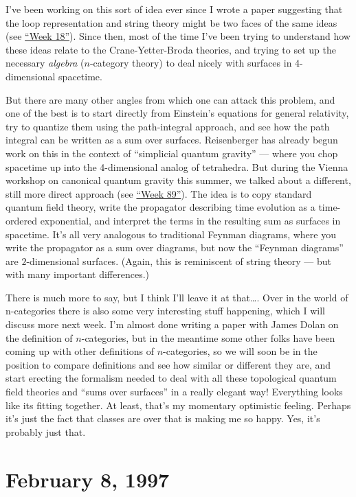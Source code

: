 \documentclass{article}
\begin{document}
I've been working on this sort of idea ever since I wrote a paper
suggesting that the loop representation and string theory might be two
faces of the same ideas (see \protect\hyperlink{week18}{``Week 18''}).
Since then, most of the time I've been trying to understand how these
ideas relate to the Crane-Yetter-Broda theories, and trying to set up
the necessary \emph{algebra} (\(n\)-category theory) to deal nicely with
surfaces in 4-dimensional spacetime.

But there are many other angles from which one can attack this problem,
and one of the best is to start directly from Einstein's equations for
general relativity, try to quantize them using the path-integral
approach, and see how the path integral can be written as a sum over
surfaces. Reisenberger has already begun work on this in the context of
``simplicial quantum gravity'' --- where you chop spacetime up into the
4-dimensional analog of tetrahedra. But during the Vienna workshop on
canonical quantum gravity this summer, we talked about a different,
still more direct approach (see \protect\hyperlink{week89}{``Week
89''}). The idea is to copy standard quantum field theory, write the
propagator describing time evolution as a time-ordered exponential, and
interpret the terms in the resulting sum as surfaces in spacetime. It's
all very analogous to traditional Feynman diagrams, where you write the
propagator as a sum over diagrams, but now the ``Feynman diagrams'' are
\(2\)-dimensional surfaces. (Again, this is reminiscent of string theory
--- but with many important differences.)

There is much more to say, but I think I'll leave it at that\ldots. Over
in the world of n-categories there is also some very interesting stuff
happening, which I will discuss more next week. I'm almost done writing
a paper with James Dolan on the definition of \(n\)-categories, but in
the meantime some other folks have been coming up with other definitions
of \(n\)-categories, so we will soon be in the position to compare
definitions and see how similar or different they are, and start
erecting the formalism needed to deal with all these topological quantum
field theories and ``sums over surfaces'' in a really elegant way!
Everything looks like its fitting together. At least, that's my
momentary optimistic feeling. Perhaps it's just the fact that classes
are over that is making me so happy. Yes, it's probably just that.



\hypertarget{week97}{%
\section{February 8, 1997}\label{week97}}
\end{document}

